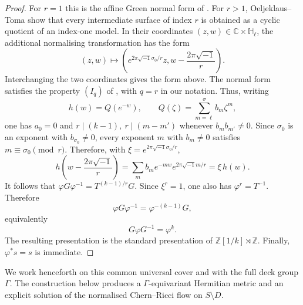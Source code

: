 \documentclass[12pt]{amsart}
\numberwithin{equation}{section}
\theoremstyle{remark}
\theoremstyle{definition}
\begin{document}
\begin{proof}
For $r=1$ this is the affine Green normal form of
\cite{dloussky-oeljeklaus-toma}. For $r>1$, Oeljeklaus--Toma
\cite[Section~3.2 and Remark~4.4]{oeljeklaus-toma-moduli} show that every
intermediate surface of index $r$ is obtained as a cyclic quotient of an
index-one model. In their coordinates $(z,w)\in\mathbb C\times\mathbb H_\ell$,
the additional normalising transformation has the form
$$
(z,w)\longmapsto
\left(e^{2\pi\sqrt{-1}\sigma_0/r}z,
w-\frac{2\pi\sqrt{-1}}{r}\right).
$$
Interchanging the two coordinates gives the form above. 
The normal form satisfies the property $(I_q)$ of
\cite[Section~3.2, p.~329]{oeljeklaus-toma-moduli}, with $q=r$ in our notation. Thus, writing
$$
h(w)=Q(e^{-w}),\qquad Q(\zeta)=\sum_{m=\ell}^{\sigma} b_m\zeta^m,
$$
one has $a_0=0$ and
$
r\mid(k-1),\ r\mid(m-m')
$
whenever $b_m b_{m'}\neq0$. Since $\sigma_0$ is an exponent with $b_{\sigma_0}\neq0$, every exponent $m$ with $b_m\neq0$ satisfies
$
m\equiv\sigma_0\pmod r.
$
Therefore, with $\xi=e^{2\pi\sqrt{-1}\sigma_0/r}$,
$$
h\left(w-\frac{2\pi\sqrt{-1}}{r}\right)
=
\sum_m b_m e^{-mw}e^{2\pi\sqrt{-1}m/r}
=
\xi\,h(w).
$$
It follows that
$
\varphi G\varphi^{-1}=T^{(k-1)/r}G.
$
Since $\xi^r=1$, one also has $\varphi^r=T^{-1}$. Therefore
$$
\varphi G\varphi^{-1}=\varphi^{-(k-1)}G,
$$
equivalently
$$
G\varphi G^{-1}=\varphi^k.
$$
The resulting presentation is the standard presentation of
$\mathbb Z[1/k]\rtimes\mathbb Z$. Finally, $\varphi^*s=s$ is immediate.
\end{proof}

We work henceforth on this common universal cover and with the full deck group $\Gamma$. The construction below produces a $\Gamma$-equivariant Hermitian metric and an explicit solution of the normalised Chern--Ricci flow on $S\setminus D$.
\end{document}
